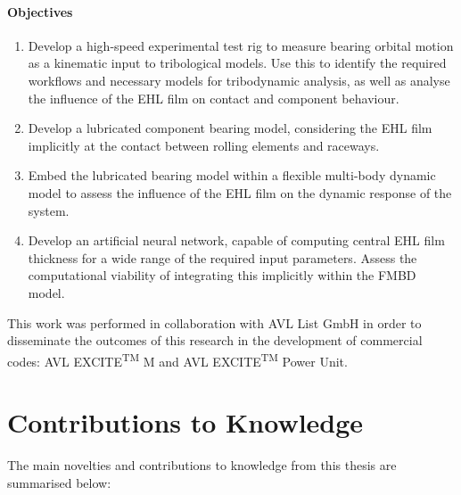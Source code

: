\paragraph{Objectives}
\begin{enumerate}
	\item Develop a high-speed experimental test rig to measure bearing orbital motion as a kinematic input to tribological models. Use this to identify the required workflows and necessary models for tribodynamic analysis, as well as analyse the influence of the EHL film on contact and component behaviour.
	\item Develop a lubricated component bearing model, considering the EHL film implicitly at the contact between rolling elements and raceways.
	\item Embed the lubricated bearing model within a flexible multi-body dynamic model to assess the influence of the EHL film on the dynamic response of the system. 
	\item Develop an artificial neural network, capable of computing central EHL film thickness for a wide range of the required input parameters. Assess the computational viability of integrating this implicitly within the FMBD model.
\end{enumerate}

This work was performed in collaboration with AVL List GmbH in order to disseminate the outcomes of this research in the development of commercial codes: AVL EXCITE\textsuperscript{TM} M and AVL EXCITE\textsuperscript{TM} Power Unit.

\section{Contributions to Knowledge} \label{Contribution to Knowledge Intro}

The main novelties and contributions to knowledge from this thesis are summarised below:


